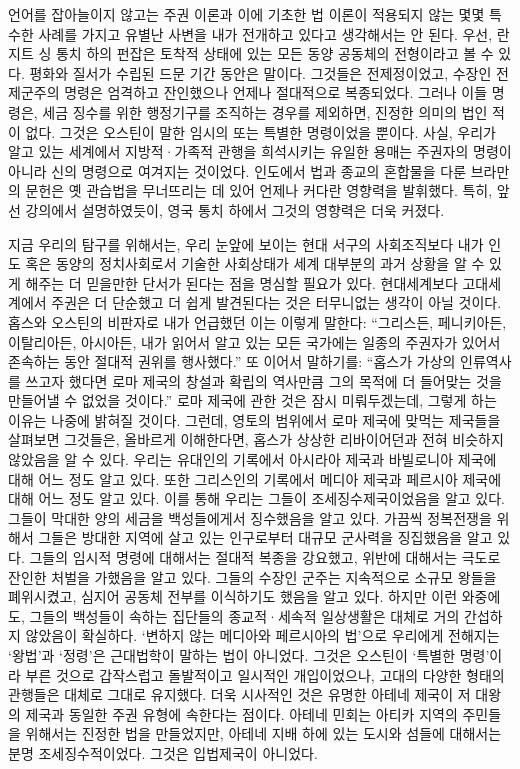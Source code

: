 언어를 잡아늘이지 않고는
주권 이론과 이에 기초한 법 이론이
적용되지 않는 몇몇 특수한 사례를 가지고 유별난 사변을
내가 전개하고 있다고 생각해서는 안 된다.
우선, 란지트 싱 통치 하의 펀잡은
토착적 상태에 있는 모든 동양 공동체의 전형이라고 볼 수 있다.
평화와 질서가 수립된 드문 기간 동안은 말이다.
그것들은 전제정이었고,
수장인 전제군주의 명령은 엄격하고 잔인했으나
언제나 절대적으로 복종되었다.
그러나 이들 명령은,
세금 징수를 위한 행정기구를 조직하는 경우를 제외하면,
진정한 의미의 법인 적이 없다.
그것은 오스틴이 말한 임시의 또는 특별한 명령이었을 뿐이다.
사실,
우리가 알고 있는 세계에서
지방적·가족적 관행을 희석시키는 유일한 용매는
주권자의 명령이 아니라 신의 명령으로 여겨지는 것이었다.
인도에서 법과 종교의 혼합물을 다룬 브라만의 문헌은
옛 관습법을 무너뜨리는 데 있어 언제나 커다란 영향력을 발휘했다.
특히, 앞선 강의에서 설명하였듯이, 영국 통치 하에서
그것의 영향력은 더욱 커졌다.

지금 우리의 탐구를 위해서는,
우리 눈앞에 보이는 현대 서구의 사회조직보다
내가 인도 혹은 동양의 정치사회로서 기술한 사회상태가
세계 대부분의 과거 상황을 알 수 있게 해주는 더 믿을만한 단서가 된다는 점을
명심할 필요가 있다.
현대세계보다 고대세계에서 주권은 더 단순했고 더 쉽게 발견된다는 것은
터무니없는 생각이 아닐 것이다.
홉스와 오스틴의 비판자로 내가 언급했던 이는 이렇게 말한다:
``그리스든, 페니키아든, 이탈리아든, 아시아든,
내가 읽어서 알고 있는 모든 국가에는
일종의 주권자가 있어서 존속하는 동안 절대적 권위를 행사했다.''
또 이어서 말하기를:
``홉스가 가상의 인류역사를 쓰고자 했다면
로마 제국의 창설과 확립의 역사만큼 그의 목적에 더 들어맞는 것을
만들어낼 수 없었을 것이다.''
로마 제국에 관한 것은 잠시 미뤄두겠는데,
그렇게 하는 이유는 나중에 밝혀질 것이다.
그런데,
영토의 범위에서 로마 제국에 맞먹는 제국들을 살펴보면
그것들은, 올바르게 이해한다면,
홉스가 상상한 리바이어던과 전혀 비슷하지 않았음을
알 수 있다.
우리는 유대인의 기록에서 아시라아 제국과 바빌로니아 제국에 대해
어느 정도 알고 있다.
또한 그리스인의 기록에서 메디아 제국과 페르시아 제국에 대해
어느 정도 알고 있다.
이를 통해 우리는 그들이 조세징수제국이었음을 알고 있다.
그들이 막대한 양의 세금을 백성들에게서 징수했음을 알고 있다.
가끔씩 정복전쟁을 위해서 그들은 방대한 지역에 살고 있는 인구로부터
대규모 군사력을 징집했음을 알고 있다.
그들의 임시적 명령에 대해서는 절대적 복종을 강요했고, 위반에 대해서는
극도로 잔인한 처벌을 가했음을 알고 있다.
그들의 수장인 군주는 지속적으로 소규모 왕들을 폐위시켰고,
심지어 공동체 전부를 이식하기도 했음을 알고 있다.
하지만 이런 와중에도,
그들의 백성들이 속하는 집단들의 종교적·세속적 일상생활은
대체로 거의 간섭하지 않았음이 확실하다.
`변하지 않는 메디아와 페르시아의 법'으로
우리에게 전해지는 `왕법'과 `정령'은
근대법학이 말하는 법이 아니었다.
그것은 오스틴이 `특별한 명령'이라 부른 것으로
갑작스럽고 돌발적이고 일시적인 개입이었으나,
고대의 다양한 형태의 관행들은 대체로 그대로 유지했다.
더욱 시사적인 것은
유명한 아테네 제국이
저 대왕의 제국과 동일한 주권 유형에 속한다는 점이다.
아테네 민회는 아티카 지역의 주민들을 위해서는 진정한 법을 만들었지만,
아테네 지배 하에 있는 도시와 섬들에 대해서는 분명
조세징수적이었다.
그것은 입법제국이 아니었다.

